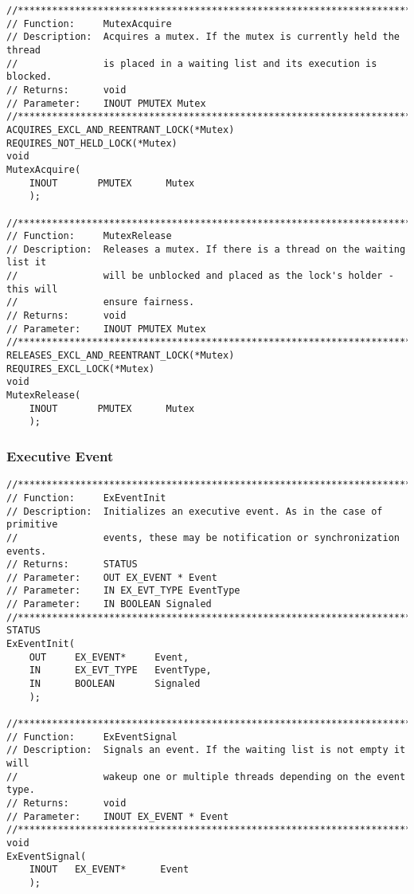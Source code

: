 \begin{appendices}
\begin{lstlisting}[caption={Mutex Functions},label={lst:MutexFunc}]
//******************************************************************************
// Function:     MutexAcquire
// Description:  Acquires a mutex. If the mutex is currently held the thread
//               is placed in a waiting list and its execution is blocked.
// Returns:      void
// Parameter:    INOUT PMUTEX Mutex
//******************************************************************************
ACQUIRES_EXCL_AND_REENTRANT_LOCK(*Mutex)
REQUIRES_NOT_HELD_LOCK(*Mutex)
void
MutexAcquire(
    INOUT       PMUTEX      Mutex
    );

//******************************************************************************
// Function:     MutexRelease
// Description:  Releases a mutex. If there is a thread on the waiting list it
//               will be unblocked and placed as the lock's holder - this will
//               ensure fairness.
// Returns:      void
// Parameter:    INOUT PMUTEX Mutex
//******************************************************************************
RELEASES_EXCL_AND_REENTRANT_LOCK(*Mutex)
REQUIRES_EXCL_LOCK(*Mutex)
void
MutexRelease(
    INOUT       PMUTEX      Mutex
    );
\end{lstlisting}

\subsubsection{Executive Event}
\label{sect:ExEvent}


\begin{lstlisting}[caption={Executive Event Functions},label={lst:ExEventFunc}]
//******************************************************************************
// Function:     ExEventInit
// Description:  Initializes an executive event. As in the case of primitive
//               events, these may be notification or synchronization events.
// Returns:      STATUS
// Parameter:    OUT EX_EVENT * Event
// Parameter:    IN EX_EVT_TYPE EventType
// Parameter:    IN BOOLEAN Signaled
//******************************************************************************
STATUS
ExEventInit(
    OUT     EX_EVENT*     Event,
    IN      EX_EVT_TYPE   EventType,
    IN      BOOLEAN       Signaled
    );

//******************************************************************************
// Function:     ExEventSignal
// Description:  Signals an event. If the waiting list is not empty it will
//               wakeup one or multiple threads depending on the event type.
// Returns:      void
// Parameter:    INOUT EX_EVENT * Event
//******************************************************************************
void
ExEventSignal(
    INOUT   EX_EVENT*      Event
    );


\end{lstlisting}
\end{appendices}
